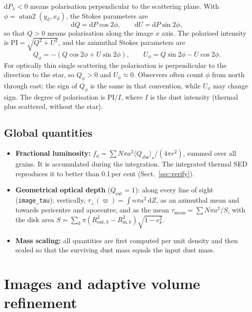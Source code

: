 \documentclass[11pt,a4paper]{article}
\newcommand{\code}[1]{\texttt{#1}}
\newcommand{\dd}{\mathrm{d}}
\begin{document}
$\dd P_\lambda<0$ means polarisation perpendicular to the scattering plane. With
$\phi=\operatorname{atan2}(y_\mathrm{d},x_\mathrm{d})$, the Stokes parameters are
\begin{equation}
\dd Q = \dd P\cos2\phi,\qquad \dd U = \dd P\sin2\phi,
\end{equation}
so that $Q>0$ means polarisation along the image $x$ axis. The polarised intensity is
$\mathrm{PI}=\sqrt{Q^2+U^2}$, and the azimuthal Stokes parameters are
\begin{equation}
Q_\phi = -(Q\cos2\phi + U\sin2\phi),\qquad U_\phi = Q\sin2\phi - U\cos2\phi .
\end{equation}
For optically thin single scattering the polarisation is perpendicular to the direction to the
star, so $Q_\phi>0$ and $U_\phi\approx0$. Observers often count $\phi$ from north through east;
the sign of $Q_\phi$ is the same in that convention, while $U_\phi$ may change sign. The degree of
polarisation is $\mathrm{PI}/I$, where $I$ is the dust intensity (thermal plus scattered, without
the star).

\subsection{Global quantities}

\begin{itemize}
\item \textbf{Fractional luminosity:}
      $f_\mathrm{d} = \sum N\pi a^2\langle Q_\mathrm{abs}\rangle_\star/(4\pi r^2)$, summed over
      all grains. It is accumulated during the integration. The integrated thermal SED
      reproduces it to better than 0.1\,per cent (Sect.~\ref{sec:verify}).
\item \textbf{Geometrical optical depth} ($Q_\mathrm{ext}=1$): along every line of sight
      (\code{image\_tau}); vertically, $\tau_\perp(\varpi)=\int n\pi a^2\,\dd Z$, as an azimuthal
      mean and towards pericentre and apocentre; and as the mean
      $\tau_\mathrm{mean}=\sum N\pi a^2/S$, with the disk area
      $S=\sum_k\pi(R_{\mathrm{out},k}^2-R_{\mathrm{in},k}^2)\sqrt{1-e_k^2}$.
\item \textbf{Mass scaling:} all quantities are first computed per unit density and then scaled
      so that the surviving dust mass equals the input dust mass.
\end{itemize}

\section{Images and adaptive volume refinement}
\label{sec:amr}
\end{document}
